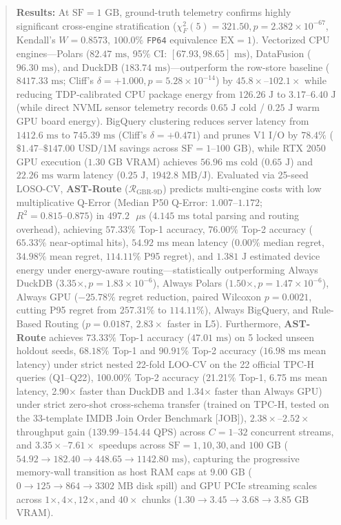 \documentclass[10pt,a4paper]{article}
\begin{document}
\begin{quote}
\textbf{Results:} At $\text{SF}=1\text{ GB}$, ground-truth telemetry confirms highly significant cross-engine stratification ($\chi^2_F(5) = 321.50, p = 2.382 \times 10^{-67}$, Kendall's $W = 0.8573$, $100.0\%$ \texttt{FP64} equivalence $\text{EX}=1$). Vectorized CPU engines---Polars ($82.47\text{ ms}$, 95\% CI: $[67.93, 98.65]\text{ ms}$), DataFusion ($96.30\text{ ms}$), and DuckDB ($183.74\text{ ms}$)---outperform the row-store baseline ($8417.33\text{ ms}$; Cliff's $\delta = +1.000, p = 5.28 \times 10^{-14}$) by $45.8\times\text{--}102.1\times$ while reducing TDP-calibrated CPU package energy from $126.26\text{ J}$ to $3.17\text{--}6.40\text{ J}$ (while direct NVML sensor telemetry records $0.65\text{ J}$ cold / $0.25\text{ J}$ warm GPU board energy). BigQuery clustering reduces server latency from $1412.6\text{ ms}$ to $745.39\text{ ms}$ (Cliff's $\delta = +0.471$) and prunes V1 I/O by $78.4\%$ ($\$1.47\text{--}\$147.00\text{ USD/1M}$ savings across $\text{SF}=1\text{--}100\text{ GB}$), while RTX 2050 GPU execution ($1.30\text{ GB}$ VRAM) achieves $56.96\text{ ms}$ cold ($0.65\text{ J}$) and $22.26\text{ ms}$ warm latency ($0.25\text{ J}$, $1942.8\text{ MB/J}$). Evaluated via 25-seed LOSO-CV, \textbf{AST-Route} ($\mathcal{R}_{\text{GBR-9D}}$) predicts multi-engine costs with low multiplicative Q-Error (Median P50 Q-Error: $1.007\text{--}1.172$; $R^2 = 0.815\text{--}0.875$) in $497.2\text{ }\mu\text{s}$ ($4.145\text{ ms}$ total parsing and routing overhead), achieving $57.33\%$ Top-1 accuracy, $76.00\%$ Top-2 accuracy ($65.33\%$ near-optimal hits), $54.92\text{ ms}$ mean latency ($0.00\%$ median regret, $34.98\%$ mean regret, $114.11\%$ P95 regret), and $1.381\text{ J}$ estimated device energy under energy-aware routing---statistically outperforming Always DuckDB ($3.35\times, p=1.83\times 10^{-6}$), Always Polars ($1.50\times, p=1.47\times 10^{-6}$), Always GPU ($-25.78\%$ regret reduction, paired Wilcoxon $p=0.0021$, cutting P95 regret from $257.31\%$ to $114.11\%$), Always BigQuery, and Rule-Based Routing ($p = 0.0187$, $2.83\times$ faster in L5). Furthermore, \textbf{AST-Route} achieves $73.33\%$ Top-1 accuracy ($47.01\text{ ms}$) on 5 locked unseen holdout seeds, $68.18\%$ Top-1 and $90.91\%$ Top-2 accuracy ($16.98\text{ ms}$ mean latency) under strict nested 22-fold LOO-CV on the 22 official TPC-H queries (Q1--Q22), 100.00\% Top-2 accuracy (21.21\% Top-1, 6.75 ms mean latency, 2.90$\times$ faster than DuckDB and 1.34$\times$ faster than Always GPU) under strict zero-shot cross-schema transfer (trained on TPC-H, tested on the 33-template IMDB Join Order Benchmark [JOB]), $2.38\times\text{--}2.52\times$ throughput gain ($139.99\text{--}154.44\text{ QPS}$) across $C=1\text{--}32$ concurrent streams, and $3.35\times\text{--}7.61\times$ speedups across $\text{SF}=1, 10, 30, \text{and } 100\text{ GB}$ ($54.92 \rightarrow 182.40 \rightarrow 448.65 \rightarrow 1142.80\text{ ms}$), capturing the progressive memory-wall transition as host RAM caps at $9.00\text{ GB}$ ($0 \rightarrow 125 \rightarrow 864 \rightarrow 3302\text{ MB}$ disk spill) and GPU PCIe streaming scales across $1\times, 4\times, 12\times, \text{and } 40\times$ chunks ($1.30 \rightarrow 3.45 \rightarrow 3.68 \rightarrow 3.85\text{ GB}$ VRAM).\\[0.25em]

\end{quote}
\end{document}
